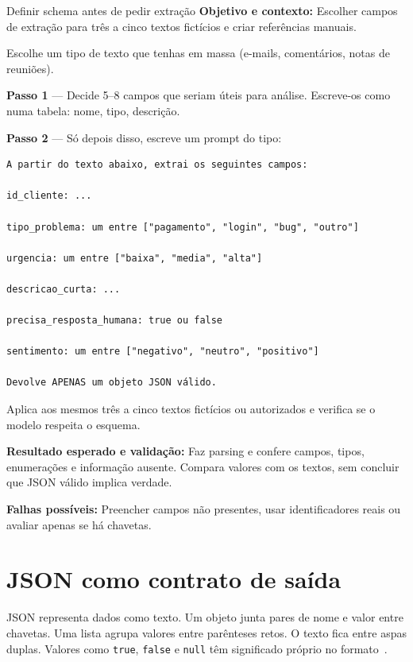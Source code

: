 \begin{promptlabbox}{Definir schema antes de pedir extração}
\textbf{Objetivo e contexto:} Escolher campos de extração para três a cinco textos fictícios e criar referências manuais.

Escolhe um tipo de texto que tenhas em massa (e-mails, comentários, notas de reuniões).

\medskip

\textbf{Passo 1} — Decide 5–8 campos que seriam úteis para análise. Escreve-os como numa tabela: nome, tipo, descrição.

\textbf{Passo 2} — Só depois disso, escreve um prompt do tipo:

\begin{lstlisting}
A partir do texto abaixo, extrai os seguintes campos:

id_cliente: ...

tipo_problema: um entre ["pagamento", "login", "bug", "outro"]

urgencia: um entre ["baixa", "media", "alta"]

descricao_curta: ...

precisa_resposta_humana: true ou false

sentimento: um entre ["negativo", "neutro", "positivo"]

Devolve APENAS um objeto JSON válido.
\end{lstlisting}

Aplica aos mesmos três a cinco textos fictícios ou autorizados e verifica se o modelo respeita o esquema.

\textbf{Resultado esperado e validação:} Faz parsing e confere campos, tipos, enumerações e informação ausente. Compara valores com os textos, sem concluir que JSON válido implica verdade.

\textbf{Falhas possíveis:} Preencher campos não presentes, usar identificadores reais ou avaliar apenas se há chavetas.
\end{promptlabbox}

\section{JSON como contrato de saída}

JSON representa dados como texto. Um objeto junta pares de nome e valor entre chavetas. Uma lista agrupa valores entre parênteses retos. O texto fica entre aspas duplas. Valores como \texttt{true}, \texttt{false} e \texttt{null} têm significado próprio no formato~\citep{rfc8259}.

